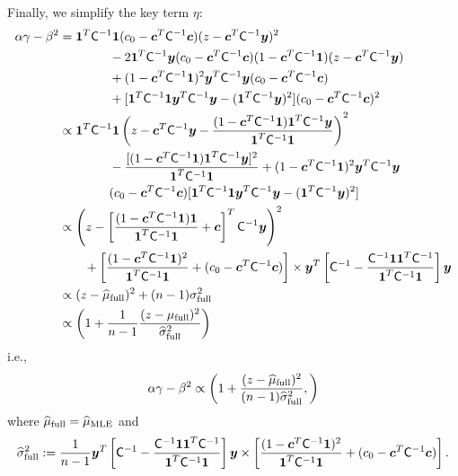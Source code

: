 \documentclass{iitthesis}          %
\newcommand{\bm}[1]{\boldsymbol{#1}}
\newcommand{\vc}{\bm{c}}
\newcommand{\vy}{\bm{y}}
\newcommand{\vone}{\bm{1}}
\newcommand{\mC}{\mathsf{C}}
\newcommand{\hmu}{\widehat{\mu}}
\newcommand{\hsigma}{\widehat{\sigma}}
\newcommand{\MLE}{\textup{MLE}}
\begin{document}
Finally, we simplify the key term $\eta$:
\begin{align*}
\alpha \gamma - \beta^2 
& = \vone^T \mC^{-1} \vone (c_0  -\vc ^T \mC^{-1} \vc) (z - \vc^T \mC^{-1} \vy )^2 \\
& \qquad \qquad - 2 \vone^T \mC^{-1} \vy (c_0  -\vc ^T \mC^{-1} \vc)(1 - \vc^T \mC^{-1} \vone)(z - \vc^T \mC^{-1} \vy ) \\
& \qquad \qquad + (1 - \vc^T \mC^{-1} \vone)^2 \vy^T \mC^{-1} \vy (c_0  -\vc ^T \mC^{-1} \vc) \\
&\qquad \qquad  + [\vone^T \mC^{-1} \vone \vy^T \mC^{-1} \vy - (\vone^T \mC^{-1} \vy)^2](c_0  -\vc ^T \mC^{-1} \vc)^2  \\
& \propto \vone^T \mC^{-1} \vone  \left (z - \vc^T \mC^{-1} \vy - \frac{(1 - \vc^T \mC^{-1} \vone)\vone^T \mC^{-1} \vy}{\vone^T \mC^{-1} \vone } \right )^2 \\
& \qquad \qquad -  \frac{[(1 - \vc^T \mC^{-1} \vone)\vone^T \mC^{-1} \vy]^2}{\vone^T \mC^{-1} \vone }  
+ (1 - \vc^T \mC^{-1} \vone)^2 \vy^T \mC^{-1} \vy \\
& \qquad \qquad (c_0  -\vc ^T \mC^{-1} \vc) [\vone^T \mC^{-1} \vone  \vy^T \mC^{-1} \vy
- (\vone^T \mC^{-1} \vy)^2] \\
& \propto \left (z - \left[ \frac{(1 - \vc^T \mC^{-1} \vone)\vone}{\vone^T \mC^{-1} \vone } + \vc \right]^T \mC^{-1} \vy \right )^2 \\
& \qquad  + \left[\frac{(1 - \vc^T \mC^{-1} \vone)^2}{\vone^T \mC^{-1} \vone} + (c_0  -\vc ^T \mC^{-1} \vc) \right] \times \vy^T\left[ \mC^{-1} 
- \frac{ \mC^{-1} \vone\vone^T \mC^{-1}}{\vone^T \mC^{-1} \vone}  \right]\vy
\\
& \propto (z - \widehat{\mu}_{\textup{full}})^2 + (n-1) \sigma_{\textup{full}}^2
\\
& \propto \left(1 +  \frac{1}{n-1} \frac{(z - \mu_{\textup{full}})^2}{\widehat{\sigma}_{\textup{full}}^2} \right)
\end{align*}
i.e.,
\begin{align*}
\alpha \gamma - \beta^2 \propto 
\left(
1 +  \frac{(z - \hmu_{\textup{full}})^2}{(n-1)\widehat{\sigma}_{\textup{full}}^2}, 
\right)
\end{align*}
where $\hmu_{\textup{full}} = \hmu_{\MLE}$ and 
\begin{multline*}
\hsigma^2_{\textup{full}} 
:= \frac{1}{n-1}
\vy^T\left[ \mC^{-1} 
- \frac{ \mC^{-1} \vone\vone^T \mC^{-1}}{\vone^T \mC^{-1} \vone}  \right]\vy
\times  \left[\frac{(1 - \vc^T \mC^{-1} \vone)^2}{\vone^T \mC^{-1} \vone} + (c_0  -\vc ^T \mC^{-1} \vc) \right].
\end{multline*}
\end{document}
